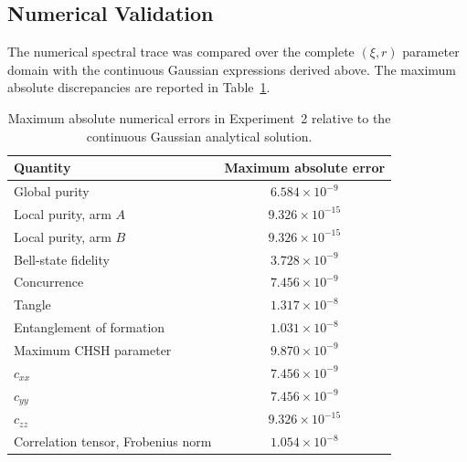 
\subsection{Numerical Validation}

The numerical spectral trace was compared over the complete
\((\xi,r)\) parameter domain with the continuous Gaussian expressions derived
above. The maximum absolute discrepancies are reported in
Table~\ref{tab:exp2_validation_errors}.

\begin{table}[htbp]
    \centering
    \caption{
    Maximum absolute numerical errors in Experiment~2 relative to the continuous
    Gaussian analytical solution.
    }
    \label{tab:exp2_validation_errors}

    \begin{tabular}{lc}
        \hline
        Quantity & Maximum absolute error
        \\
        \hline

        Global purity
        & \(6.584\times10^{-9}\)
        \\

        Local purity, arm \(A\)
        & \(9.326\times10^{-15}\)
        \\

        Local purity, arm \(B\)
        & \(9.326\times10^{-15}\)
        \\

        Bell-state fidelity
        & \(3.728\times10^{-9}\)
        \\

        Concurrence
        & \(7.456\times10^{-9}\)
        \\

        Tangle
        & \(1.317\times10^{-8}\)
        \\

        Entanglement of formation
        & \(1.031\times10^{-8}\)
        \\

        Maximum CHSH parameter
        & \(9.870\times10^{-9}\)
        \\

        \(c_{xx}\)
        & \(7.456\times10^{-9}\)
        \\

        \(c_{yy}\)
        & \(7.456\times10^{-9}\)
        \\

        \(c_{zz}\)
        & \(9.326\times10^{-15}\)
        \\

        Correlation tensor, Frobenius norm
        & \(1.054\times10^{-8}\)
        \\

        \hline
    \end{tabular}
\end{table}

